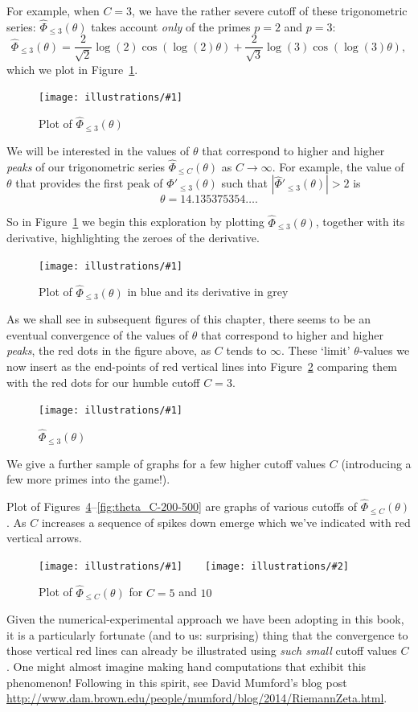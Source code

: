 \documentclass[openany]{book}
\newcommand{\ill}[3]{%
   \begin{figure}[H]%
   \vspace{-2ex}
   \centering%
   \texttt{[image: illustrations/\#1]}%
   \caption{#3}%
   \vspace{-2ex}
    \end{figure}}
\newcommand{\illtwo}[4]{%
   \begin{figure}[H]\centering%
   \texttt{[image: illustrations/\#1]}$\qquad$\texttt{[image: illustrations/\#2]}%
   \caption{#4}%
    \end{figure}}
\theoremstyle{plain}
\theoremstyle{definition}
\begin{document}
{For example, when $C=3$, we have the rather severe cutoff of these trigonometric series: ${\hat \Phi}_{\leq 3}(\theta)$ takes account {\it only} of the primes $p=2$ and $p=3$:
$$
  {\hat \Phi}_{\leq 3}(\theta) =
  \frac{2}{\sqrt{2}} \log(2)\cos(\log(2)\theta)
 +
 \frac{2}{\sqrt{3}} \log(3)\cos(\log(3)\theta),
$$
which we plot in Figure~\ref{fig:theta3}.


\ill{theta_3_intro-1}{.85}{Plot of ${\hat \Phi}_{\leq 3}(\theta)$\label{fig:theta3}}


We will be interested in the values of $\theta$ that correspond to higher and higher {\it peaks} of our trigonometric series ${\hat \Phi}_{\leq C}(\theta)$ as $C\to \infty$. For example, the value of $\theta$ that provides the first peak of $
  {\hat \Phi'}_{\leq 3}(\theta)$ such that $
  |{\hat \Phi'}_{\leq 3}(\theta)| > 2$  is $$\theta=14.135375354\ldots.$$

  So in Figure~\ref{fig:theta3} we begin this exploration by plotting ${\hat \Phi}_{\leq 3}(\theta)$, together with its derivative, highlighting the zeroes of the derivative.


\ill{theta_3_intro-2}{.85}{Plot of ${\hat \Phi}_{\leq 3}(\theta)$ in blue and its derivative in grey\label{fig:theta4}}

As we shall see in subsequent figures of this chapter, there seems to be an eventual convergence of the values of $\theta$ that correspond to higher and higher {\it peaks}, the red dots in the figure above,  as $C$ tends to $\infty$. These `limit' $\theta$-values we now insert as the end-points of red vertical lines into Figure~\ref{fig:theta4} comparing them with the red dots for our humble cutoff $C=3$.



\ill{theta_C-3}{0.9}{${\hat \Phi}_{\leq 3}(\theta)$ \label{fig:theta5}}



We give a further sample of graphs for a few higher cutoff values $C$ (introducing a few more primes into the game!).

 Plot of
Figures~\ref{fig:theta_C-5-10}--\ref{fig:theta_C-200-500}
are graphs of various cutoffs of ${\hat \Phi}_{\leq C}(\theta)$.
As $C$ increases a sequence of spikes down emerge
which we've indicated with red vertical arrows.



 \illtwo{theta_C-5}{theta_C-10}{0.45}{Plot of ${\hat \Phi}_{\leq C}(\theta)$ for $C=5$ and $10$\label{fig:theta_C-5-10}}

 Given the numerical-experimental approach we have been adopting in this book, it is  a particularly fortunate (and to us: surprising) thing that the convergence to those vertical red lines can already be illustrated using {\it such small} cutoff values $C$.  One might almost imagine making hand computations that exhibit this phenomenon! Following in this spirit, see David Mumford's blog post {\url{http://www.dam.brown.edu/people/mumford/blog/2014/RiemannZeta.html}}.

}
\end{document}

